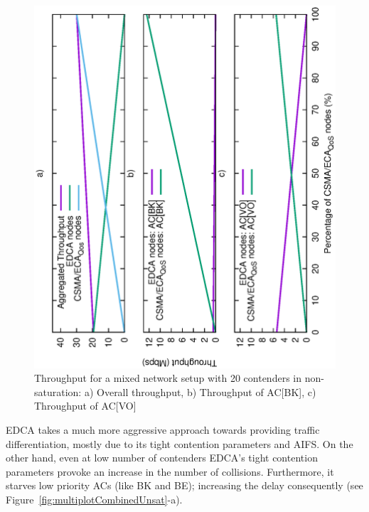 

\begin{center}
\begin{minipage}{0.7\linewidth}
\begin{figure}[H]
	\centering
		\includegraphics[width=0.8\linewidth,angle = -90]{figures/legacyEvolution.eps}
		\caption{Throughput for a mixed network setup with 20 contenders in non-saturation: a) Overall throughput, b) Throughput of AC[BK], c) Throughput of AC[VO]}
		\label{fig:legacyEvolution}
\end{figure}
\end{minipage}
\end{center}

EDCA takes a much more aggressive approach towards providing traffic differentiation, mostly due to its tight contention parameters and AIFS. On the other hand, even at low number of contenders EDCA's tight contention parameters provoke an increase in the number of collisions. Furthermore, it starves low priority ACs (like BK and BE); increasing the delay consequently (see Figure~\ref{fig:multiplotCombinedUnsat}-a).

